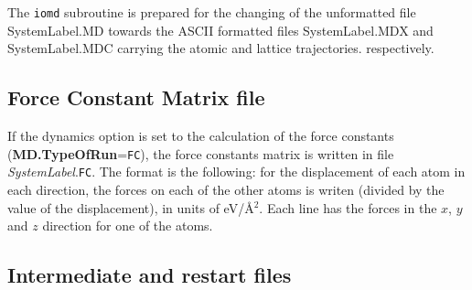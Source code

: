 The {\tt iomd} subroutine is prepared for the changing of the 
unformatted file SystemLabel.MD towards the ASCII formatted files
SystemLabel.MDX and SystemLabel.MDC carrying the atomic and lattice
trajectories. respectively.

\subsection{Force Constant Matrix file}

If the dynamics option is set to the calculation 
of the force constants ({\bf MD.TypeOfRun}={\tt FC}),
the force constants matrix is written in file {\it SystemLabel}.{\tt FC}.
The format is the following: for the displacement of
each atom in each direction, the forces on each of the other
atoms is writen (divided by the value of the displacement),
in units of eV/\AA$^2$. Each line has the forces in the $x$, $y$
and $z$ direction for one of the atoms.


\subsection{Intermediate and restart files}

